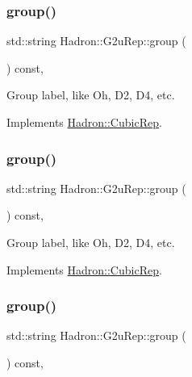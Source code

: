\subsubsection{\texorpdfstring{group()}{group()}\hspace{0.1cm}{\footnotesize\ttfamily [1/3]}}
{\footnotesize\ttfamily std\+::string Hadron\+::\+G2u\+Rep\+::group (\begin{DoxyParamCaption}{ }\end{DoxyParamCaption}) const\hspace{0.3cm}{\ttfamily [inline]}, {\ttfamily [virtual]}}

Group label, like Oh, D2, D4, etc. 

Implements \mbox{\hyperlink{structHadron_1_1CubicRep_a0748f11ec87f387062c8e8981339a29c}{Hadron\+::\+Cubic\+Rep}}.

\mbox{\label{structHadron_1_1G2uRep_a6e7c7549e4d779122e5274dd0128687e}} 
\subsubsection{\texorpdfstring{group()}{group()}\hspace{0.1cm}{\footnotesize\ttfamily [2/3]}}
{\footnotesize\ttfamily std\+::string Hadron\+::\+G2u\+Rep\+::group (\begin{DoxyParamCaption}{ }\end{DoxyParamCaption}) const\hspace{0.3cm}{\ttfamily [inline]}, {\ttfamily [virtual]}}

Group label, like Oh, D2, D4, etc. 

Implements \mbox{\hyperlink{structHadron_1_1CubicRep_a0748f11ec87f387062c8e8981339a29c}{Hadron\+::\+Cubic\+Rep}}.

\mbox{\label{structHadron_1_1G2uRep_a6e7c7549e4d779122e5274dd0128687e}} 
\subsubsection{\texorpdfstring{group()}{group()}\hspace{0.1cm}{\footnotesize\ttfamily [3/3]}}
{\footnotesize\ttfamily std\+::string Hadron\+::\+G2u\+Rep\+::group (\begin{DoxyParamCaption}{ }\end{DoxyParamCaption}) const\hspace{0.3cm}{\ttfamily [inline]}, {\ttfamily [virtual]}}

